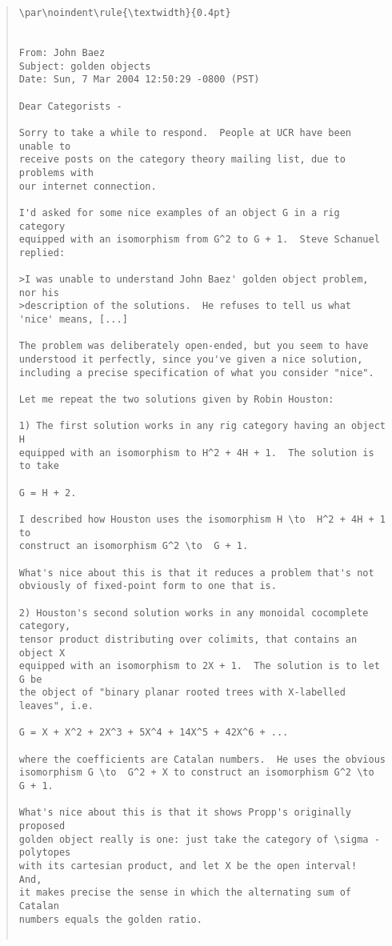 \begin{quote}
\begin{verbatim}
\par\noindent\rule{\textwidth}{0.4pt}


From: John Baez
Subject: golden objects
Date: Sun, 7 Mar 2004 12:50:29 -0800 (PST)

Dear Categorists -

Sorry to take a while to respond.  People at UCR have been unable to
receive posts on the category theory mailing list, due to problems with
our internet connection.  

I'd asked for some nice examples of an object G in a rig category
equipped with an isomorphism from G^2 to G + 1.  Steve Schanuel replied:

>I was unable to understand John Baez' golden object problem, nor his
>description of the solutions.  He refuses to tell us what 'nice' means, [...]

The problem was deliberately open-ended, but you seem to have 
understood it perfectly, since you've given a nice solution, 
including a precise specification of what you consider "nice".  

Let me repeat the two solutions given by Robin Houston:

1) The first solution works in any rig category having an object H 
equipped with an isomorphism to H^2 + 4H + 1.  The solution is to take

G = H + 2.

I described how Houston uses the isomorphism H \to  H^2 + 4H + 1 to 
construct an isomorphism G^2 \to  G + 1.  

What's nice about this is that it reduces a problem that's not 
obviously of fixed-point form to one that is.

2) Houston's second solution works in any monoidal cocomplete category, 
tensor product distributing over colimits, that contains an object X 
equipped with an isomorphism to 2X + 1.  The solution is to let G be 
the object of "binary planar rooted trees with X-labelled leaves", i.e.

G = X + X^2 + 2X^3 + 5X^4 + 14X^5 + 42X^6 + ...

where the coefficients are Catalan numbers.  He uses the obvious 
isomorphism G \to  G^2 + X to construct an isomorphism G^2 \to  G + 1.

What's nice about this is that it shows Propp's originally proposed
golden object really is one: just take the category of \sigma -polytopes 
with its cartesian product, and let X be the open interval!  And,
it makes precise the sense in which the alternating sum of Catalan
numbers equals the golden ratio.


\end{verbatim}
\end{quote}
